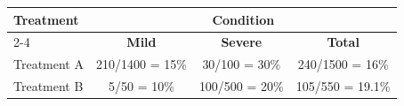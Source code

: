 \begin{table}
  \centering
  \renewcommand{\arraystretch}{1.3} %
  \setlength{\tabcolsep}{10pt}      %
  \begin{tabular}{lccc}
    \toprule
    \multirow{2}{*}{\textbf{Treatment}} & \multicolumn{3}{c}{\textbf{Condition}} \\
    \cmidrule(lr){2-4} %
    & \textbf{Mild} & \textbf{Severe} & \textbf{Total} \\
    \midrule
    Treatment A & 210/1400 = 15\% & 30/100 = 30\% & 240/1500 = 16\% \\
    Treatment B & 5/50 = 10\%    & 100/500 = 20\% & 105/550 = 19.1\% \\
    \bottomrule
  \end{tabular}
\end{table}

